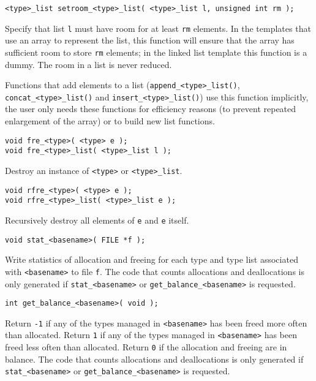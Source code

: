\begin{verbatim}
<type>_list setroom_<type>_list( <type>_list l, unsigned int rm );
\end{verbatim}
\begin{desc}
Specify that list {\tt l} must have room for at least {\tt rm} elements.
In the templates that use an array to represent the list,
this function will ensure that the array has sufficient room to
store {\tt rm} elements;
in the linked list template this function is a dummy.
The room in a list is never reduced.
\par
Functions that add elements to a list (\verb+append_<type>_list()+,
\verb+concat_<type>_list()+ and
\verb+insert_<type>_list()+) use this function implicitly, the
user only needs these functions for efficiency reasons
(to prevent repeated enlargement of the array)
or to build new list functions.
\end{desc}
\begin{verbatim}
void fre_<type>( <type> e );
void fre_<type>_list( <type>_list l );
\end{verbatim}
\begin{desc}
Destroy an instance of {\tt <type>} or {\tt <type>\_list}.
\end{desc}
\begin{verbatim}
void rfre_<type>( <type> e );
void rfre_<type>_list( <type>_list e );
\end{verbatim}
\begin{desc}
Recursively destroy all elements of {\tt e} and {\tt e} itself.
\end{desc}
\begin{verbatim}
void stat_<basename>( FILE *f );
\end{verbatim}
\begin{desc}
Write statistics of allocation and freeing for each type and type list
associated with {\tt <basename>} to file {\tt f}. The code that counts
allocations and deallocations is only generated if \verb'stat_<basename>'
or \verb'get_balance_<basename>' is requested.
\end{desc}
\begin{verbatim}
int get_balance_<basename>( void );
\end{verbatim}
\begin{desc}
\begin{sloppypar}
Return \verb+-1+ if any of the types managed in \verb"<basename>"
has been freed more often than allocated.  Return \verb+1+ if any of
the types managed in \verb"<basename>" has been freed less often than
allocated. Return \verb+0+ if the allocation and freeing are in balance.
The code that counts allocations and deallocations is only generated if
\verb'stat_<basename>' or \verb'get_balance_<basename>' is requested.
\end{sloppypar}
\end{desc}
